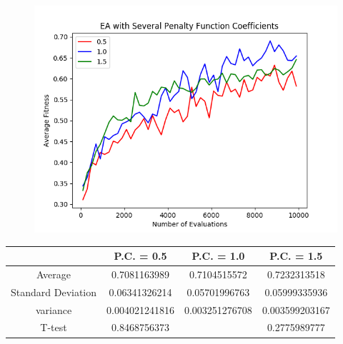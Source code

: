 \documentclass{article}
\begin{document}
		\begin{figure}[!htb]
		\centering
		\includegraphics[scale=0.4]{q3_random_board.png}
		\end{figure}
		
		\begin{center}
		\begin{tabular}{ || c | c | c | c ||}
		\hline
		       & P.C. = 0.5 & P.C. = 1.0 & P.C. = 1.5 \\ 
		 \hline\hline
		 Average & 0.7081163989 &	0.7104515572 &	0.7232313518	 \\ 
		 \hline
		 Standard Deviation &	0.06341326214 &	0.05701996763 &	0.05999335936	 \\
		 \hline
		 variance &	0.004021241816 &	0.003251276708 &	0.003599203167 \\
		 \hline
		 T-test &	0.8468756373 &	&	0.2775989777 \\
		 \hline
		\end{tabular}
		\end{center}
		
		
\end{document}
